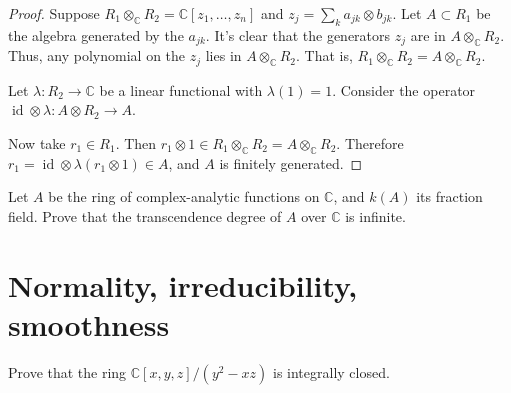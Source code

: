 \begin{proof}
Suppose 
$R_1 \otimes_{\mathbb{C}}R_2
= \mathbb{C}[z_1,…,z_n]$
and
$z_j=\sum_{k}a_{jk} \otimes b_{jk}$.
Let $A\subset R_1$ be the algebra
generated by the $a_{jk}$.
It's clear that the generators
$z_j$ are in $A\otimes_{\mathbb{C}}R_2$.
Thus, any polynomial on the $z_j$
lies in $A \otimes_{\mathbb{C}}R_2$.
That is, $R_1 \otimes_{\mathbb{C}}R_2
=A \otimes_{\mathbb{C}}R_2$.

Let $\lambda:R_2 \to \mathbb{C}$
be a linear functional with $\lambda(1)=1$.
Consider the operator
$\operatorname{id} \otimes \lambda:
A \otimes R_2 \to A$.

Now take $r_1 \in R_1$.
Then $r_1 \otimes 1 \in 
R_1 \otimes_{\mathbb{C}}R_2
=A \otimes_{\mathbb{C}}R_2$.
Therefore
$r_1=\operatorname{id}\otimes \lambda
(r_1 \otimes 1) \in A$,
and $A$ is finitely generated.
\end{proof}

\begin{exercise}
\label{exercise-trans-deg-hol-functions}
Let $A$ be the ring of complex-analytic
functions on $\mathbb{C}$,
and $k(A)$ its fraction field.
Prove that the transcendence degree
of $A$ over $\mathbb{C}$ is infinite.
\end{exercise}


\section{Normality, irreducibility,
smoothness}

\begin{exercise}
\label{exercise-normal-surface}
Prove that the ring 
$\mathbb{C}[x,y,z]/(y^2-xz)$
is integrally closed.
\end{exercise}

